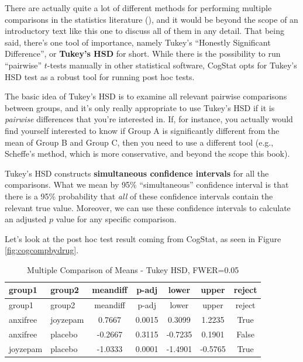 \documentclass[
  11pt,
  a4paper,
  twoside,symmetric,openright]{book}
\theoremstyle{break}
\theoremstyle{break}
\begin{document}
There are actually quite a lot of different methods for performing multiple comparisons in the statistics literature (), and it would be beyond the scope of an introductory text like this one to discuss all of them in any detail. That being said, there's one tool of importance, namely Tukey's ``Honestly Significant Difference'', or \textbf{Tukey's HSD} for short. While there is the possibility to run ``pairwise'' \(t\)-tests manually in other statistical software, CogStat opts for Tukey's HSD test as a robust tool for running post hoc tests.

The basic idea of Tukey's HSD is to examine all relevant pairwise comparisons between groups, and it's only really appropriate to use Tukey's HSD if it is \emph{pairwise} differences that you're interested in. If, for instance, you actually would find yourself interested to know if Group A is significantly different from the mean of Group B and Group C, then you need to use a different tool (e.g., Scheffe's method, which is more conservative, and beyond the scope this book).

Tukey's HSD constructs \textbf{simultaneous confidence intervals} for all the comparisons. What we mean by 95\% ``simultaneous'' confidence interval is that there is a 95\% probability that \emph{all} of these confidence intervals contain the relevant true value. Moreover, we can use these confidence intervals to calculate an adjusted \(p\) value for any specific comparison.

Let's look at the post hoc test result coming from CogStat, as seen in Figure \ref{fig:cogcompbydrug}.

\begin{longtable}[]{@{}llccccc@{}}
\caption{\label{tab:unnamed-chunk-76}Multiple Comparison of Means - Tukey HSD, FWER=0.05}\tabularnewline
\toprule\noalign{}
group1 & group2 & meandiff & p-adj & lower & upper & reject \\
\midrule\noalign{}
\endfirsthead
\toprule\noalign{}
group1 & group2 & meandiff & p-adj & lower & upper & reject \\
\midrule\noalign{}
\endhead
\bottomrule\noalign{}
\endlastfoot
anxifree & joyzepam & 0.7667 & 0.0015 & 0.3099 & 1.2235 & True \\
anxifree & placebo & -0.2667 & 0.3115 & -0.7235 & 0.1901 & False \\
joyzepam & placebo & -1.0333 & 0.0001 & -1.4901 & -0.5765 & True \\
\end{longtable}
\end{document}
